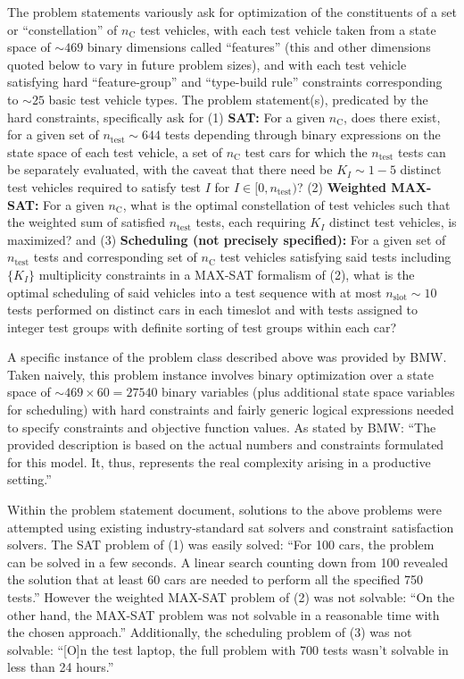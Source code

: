 \documentclass[aps,prl,twocolumn,superscriptaddress,groupedaddress]{revtex4}  %
\begin{document}
The problem statements variously ask for optimization of the constituents of a
set or
``constellation'' of $n_{\mathrm{C}}$ test vehicles, with each test vehicle taken
from a state space of $\sim 469$ binary dimensions called ``features'' (this and other dimensions
quoted below to vary
in future problem sizes), and with each test vehicle 
satisfying hard ``feature-group'' and ``type-build rule'' constraints
corresponding to $\sim 25$ basic test vehicle types. The problem
statement(s), predicated by the hard constraints, specifically ask for
(1) \textbf{SAT:} 
For a given $n_{\mathrm{C}}$, does there exist, for a given set of
$n_{\mathrm{test}} \sim 644$ tests depending through binary expressions on the state
space of each test vehicle, a set of $n_{\mathrm{C}}$ test cars for which the
$n_{\mathrm{test}}$ tests can be separately evaluated, with the caveat 
that there need be $K_I \sim 1-5$ distinct
test vehicles required to satisfy test $I$ for $I \in [0, n_{\mathrm{test}})$?
(2) \textbf{Weighted MAX-SAT:} For a given $n_{\mathrm{C}}$, what is the optimal
constellation of test vehicles such that the weighted sum of satisfied $n_{\mathrm{test}}$
tests, each requiring $K_I$ distinct test vehicles, is maximized? and 
(3) \textbf{Scheduling (not precisely specified):} For a given set of
$n_{\mathrm{test}}$ tests and corresponding set of $n_{\mathrm{C}}$ test
vehicles satisfying said tests including $\{ K_I \}$ multiplicity constraints in
a MAX-SAT formalism of (2), what is the optimal scheduling of said vehicles into 
a test sequence with at most $n_{\mathrm{slot}} \sim 10$ tests performed on
distinct cars in each timeslot and with tests assigned to integer test groups
with definite sorting of test groups within each car?

A specific instance of the problem class described above was provided by BMW.
Taken naively, this problem instance involves binary optimization over a state
space of $\sim 469\times60 = 27540$ binary variables (plus additional state
space variables for scheduling) with hard constraints and fairly generic logical
expressions needed to specify constraints and objective function values.  As
stated by BMW: ``The provided description is based on the actual numbers and
constraints formulated for this model. It, thus, represents the real complexity
arising in a productive setting.''

Within the problem statement document, solutions to the above problems were
attempted using existing industry-standard sat solvers and constraint
satisfaction solvers. The SAT problem of (1) was easily solved:
``For 100 cars, the problem can be solved in a few seconds. A linear search counting down
from 100 revealed the solution that at least 60 cars are needed to perform all the specified
750 tests.''
However the weighted MAX-SAT problem of (2) was not solvable:
``On the other hand, the MAX-SAT problem was not solvable in a reasonable time with the
chosen approach.''
Additionally, the scheduling problem of (3) was not solvable:
``[O]n the test laptop, the full problem with 700 tests wasn't solvable in less than 24
hours.''
\end{document}
